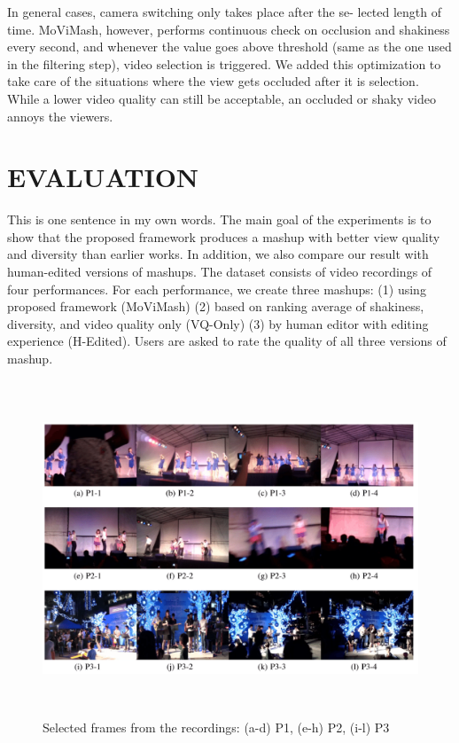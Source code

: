\documentclass{clsfile}
\begin{document}
In general cases, camera switching only takes place after the se-
lected length of time. MoViMash, however, performs continuous
check on occlusion and shakiness every second, and whenever the
value goes above threshold (same as the one used in the filtering
step), video selection is triggered. We added this optimization to
take care of the situations where the view gets occluded after it is
selection. While a lower video quality can still be acceptable, an
occluded or shaky video annoys the viewers.

\section{EVALUATION}
This is one sentence in my own words.
The main goal of the experiments is to show that the proposed
framework produces a mashup with better view quality and diversity than earlier works. In addition, we also compare our result with
human-edited versions of mashups. The dataset consists of video
recordings of four performances. For each performance, we create three mashups: (1) using proposed framework (MoViMash) (2)
based on ranking average of shakiness, diversity, and video quality only (VQ-Only) (3) by human editor with editing experience (H-Edited). Users are asked to rate the quality of all three versions of
mashup.
\begin{figure}
\centering
\includegraphics[width=14cm, height=10cm]{fig6.png}
   \caption{  Selected frames from the recordings: (a-d) P1, (e-h) P2, (i-l) P3}

\end{figure}
\end{document}
